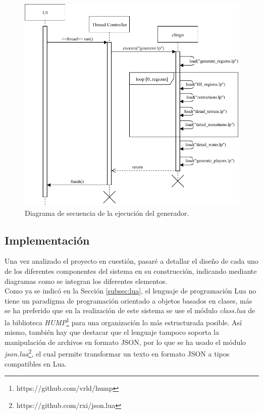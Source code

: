 \begin{figure}[!h]
	\centering
	\includegraphics[width=\textwidth]{images/secuencia.pdf}
	\caption{Diagrama de secuencia de la ejecución del generador.}
	\label{fig:sequence}
\end{figure}

\subsection{Implementación}
\label{subsec:implementacion}

Una vez analizado el proyecto en cuestión, pasaré a detallar el diseño de cada uno de los diferentes componentes del sistema en su construcción, indicando mediante diagramas como se integran los diferentes elementos. \\

Como ya se indicó en la Sección \ref{subsec:lua}, el lenguaje de programación Lua no tiene un paradigma de programación orientado a objetos basados en clases, más se ha preferido que en la realización de este sistema se use el módulo \textit{class.lua} de la biblioteca \textit{HUMP}\footnote{https://github.com/vrld/hump} para una organización lo más estructurada posible. Así mismo, también hay que destacar que el lenguaje tampoco soporta la manipulación de archivos en formato JSON, por lo que se ha usado el módulo \textit{json.lua}\footnote{https://github.com/rxi/json.lua}, el cual permite transformar un texto en formato JSON a tipos compatibles en Lua. \\

